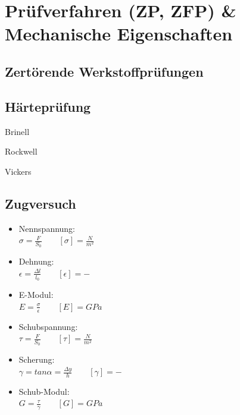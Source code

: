 \documentclass[8.5pt,twocolumn]{extarticle}
\begin{document}
    \section*{Prüfverfahren (ZP, ZFP) \& Mechanische Eigenschaften}
    \subsection{Zertörende Werkstoffprüfungen}
    \subsection{Härteprüfung}
     \begin{minipage}[t]{0.32\columnwidth}
        Brinell
    \end{minipage}\hfill
    \begin{minipage}[t]{0.32\columnwidth}
        Rockwell
    \end{minipage}\hfill
    \begin{minipage}[t]{0.32\columnwidth}
        Vickers
    \end{minipage}\hfill
    \subsection{Zugversuch}
    \begin{minipage}[t]{0.45\columnwidth}
        \begin{itemize}[label={}, leftmargin=*,  itemsep=0.1em]
            \item Nennspannung: \\ $\sigma = \frac{F}{S_0}\qquad[\sigma]=\frac{N}{m^2}$
            \item Dehnung: \\ $\epsilon = \frac{\Delta l}{l_0}\qquad[\epsilon]=-$
            \item E-Modul: \\ $E = \frac{\sigma}{\epsilon}\qquad[E]=GPa$
        \end{itemize}
    \end{minipage}\hfill
    \begin{minipage}[t]{0.55\columnwidth}
        \begin{itemize}[label={}, leftmargin=*,  itemsep=0.1em]
            \item Schubspannung: \\ $\tau = \frac{F}{S_0}\qquad[\tau]=\frac{N}{m^2}$
            \item Scherung: \\ $\gamma = tan\alpha = \frac{\Delta y}{h} \qquad[\gamma]=-$
            \item Schub-Modul: \\ $G = \frac{\tau}{\gamma}\qquad[G]=GPa$
        \end{itemize}
    \end{minipage}
\end{document}
